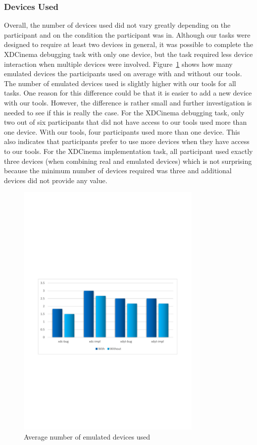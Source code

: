 \subsubsection{Devices Used}

Overall, the number of devices used did not vary greatly depending on the participant and on the condition the participant was in. Although our tasks were designed to require at least two devices in general, it was possible to complete the XDCinema debugging task with only one device, but the task required less device interaction when multiple devices were involved. Figure~\ref{fig:n_emulated} shows how many emulated devices the participants used on average with and without our tools. The number of emulated devices used is slightly higher with our tools for all tasks. One reason for this difference could be that it is easier to add a new device with our tools. However, the difference is rather small and further investigation is needed to see if this is really the case. For the XDCinema debugging task, only two out of six participants that did not have access to our tools used more than one device. With our tools, four participants used more than one device. This also indicates that participants prefer to use more devices when they have access to our tools. For the XDCinema implementation task, all participant used exactly three devices (when combining real and emulated devices) which is not surprising because the minimum number of devices required was three and additional devices did not provide any value. 

\begin{figure}[H]
  \centering
    \includegraphics[width=0.8\textwidth]{images/charts/n_emulated.pdf}
	\caption[Emulated device used]{Average number of emulated devices used}
	\label{fig:n_emulated}
\end{figure}

